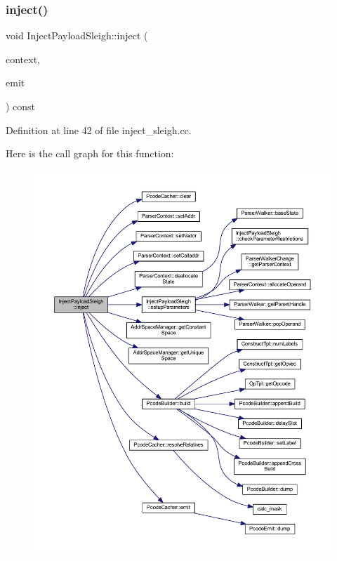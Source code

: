 \subsubsection{\texorpdfstring{inject()}{inject()}}
{\footnotesize\ttfamily void Inject\+Payload\+Sleigh\+::inject (\begin{DoxyParamCaption}\item[{\mbox{\hyperlink{class_inject_context}{Inject\+Context}} \&}]{context,  }\item[{\mbox{\hyperlink{class_pcode_emit}{Pcode\+Emit}} \&}]{emit }\end{DoxyParamCaption}) const\hspace{0.3cm}{\ttfamily [virtual]}}



Definition at line 42 of file inject\+\_\+sleigh.\+cc.

Here is the call graph for this function\+:
\nopagebreak
\begin{figure}[H]
\begin{center}
\leavevmode
\includegraphics[width=350pt]{class_inject_payload_sleigh_a54d60a04cf80a0fece97040b0dc8ed0d_cgraph}
\end{center}
\end{figure}
\mbox{\label{class_inject_payload_sleigh_af501310c66ead549c7bd48456b0c8020}} 

